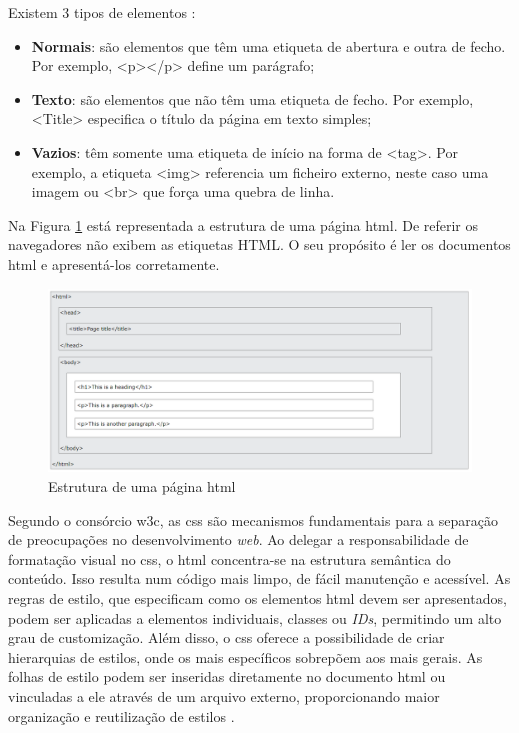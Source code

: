 Existem 3 tipos de elementos \cite{HTMLwikipedia}:
\begin{itemize}
	\item \textbf{Normais}: são elementos que têm uma etiqueta de abertura e outra de fecho. Por exemplo, <p></p> define um parágrafo;
	\item \textbf{Texto}: são elementos que não têm uma etiqueta de fecho. Por exemplo, <Title> especifica o título da página em texto simples;
	\item \textbf{Vazios}: têm somente uma etiqueta de início na forma de <tag>. Por exemplo, a etiqueta <img> referencia um ficheiro externo, neste caso uma imagem ou <br> que força uma quebra de linha.
\end{itemize}

Na Figura \ref{fig:estruturahtml} está representada a estrutura de uma página \acrshort{html}. De referir os navegadores não exibem as etiquetas HTML. O seu propósito é ler os documentos \acrshort{html} e apresentá-los corretamente.

\begin{figure}[hbtp]
	\centering
	\includegraphics[width=1\textwidth]{figures/html_page_structure.png}
	\caption{Estrutura de uma página \acrshort{html} \cite{HTMLbasics}}
	\label{fig:estruturahtml}
\end{figure}

Segundo o consórcio \acrshort{w3c}, as \acrshort{css} são mecanismos fundamentais para a separação de preocupações no desenvolvimento \textit{web}. Ao delegar a responsabilidade de formatação visual no \acrshort{css}, o \acrshort{html} concentra-se na estrutura semântica do conteúdo. Isso resulta num código mais limpo, de fácil manutenção e acessível. As regras de estilo, que especificam como os elementos \acrshort{html} devem ser apresentados, podem ser aplicadas a elementos individuais, classes ou \textit{IDs}, permitindo um alto grau de customização. Além disso, o \acrshort{css} oferece a possibilidade de criar hierarquias de estilos, onde os mais específicos sobrepõem aos mais gerais. As folhas de estilo podem ser inseridas diretamente no documento \acrshort{html} ou vinculadas a ele através de um arquivo externo, proporcionando maior organização e reutilização de estilos \cite{w3ccss}.

